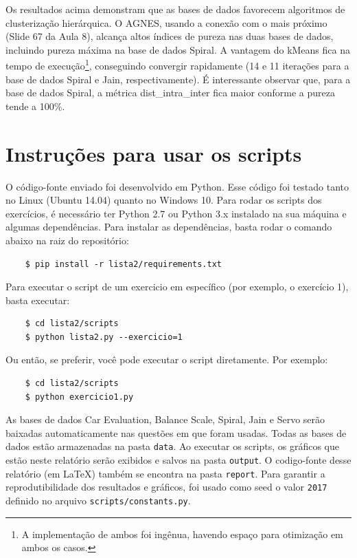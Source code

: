 \documentclass{article}
\begin{document}
Os resultados acima demonstram que as bases de dados favorecem algoritmos de clusterização hierárquica. O AGNES, usando a conexão com o mais próximo (Slide 67 da Aula 8), alcança altos índices de pureza nas duas bases de dados, incluindo pureza máxima na base de dados Spiral. A vantagem do kMeans fica na tempo de execução\footnote{A implementação de ambos foi ingênua, havendo espaço para otimização em ambos os casos.}, conseguindo convergir rapidamente (14 e 11 iterações para a base de dados Spiral e Jain, respectivamente). É interessante observar que, para a base de dados Spiral, a métrica dist\_intra\_inter fica maior conforme a pureza tende a 100\%.


\section*{Instruções para usar os scripts}

O código-fonte enviado foi desenvolvido em Python. Esse código foi testado tanto no Linux (Ubuntu 14.04) quanto no Windows 10. Para rodar os scripts dos exercícios, é necessário ter Python 2.7 ou Python 3.x instalado na sua máquina e algumas dependências. Para instalar as dependências, basta rodar o comando abaixo na raiz do repositório:

\begin{verbatim}
	$ pip install -r lista2/requirements.txt
\end{verbatim}

Para executar o script de um exercicio em específico (por exemplo, o exercício 1), basta executar:

\begin{verbatim}
	$ cd lista2/scripts
	$ python lista2.py --exercicio=1
\end{verbatim}

Ou então, se preferir, você pode executar o script diretamente. Por exemplo:

\begin{verbatim}
	$ cd lista2/scripts
	$ python exercicio1.py
\end{verbatim}

As bases de dados Car Evaluation, Balance Scale, Spiral, Jain e Servo serão baixadas automaticamente nas questões em que foram usadas. Todas as bases de dados estão armazenadas na pasta \texttt{data}. Ao executar os scripts, os gráficos que estão neste relatório serão exibidos e salvos na pasta \texttt{output}. O codigo-fonte desse relatório (em \LaTeX) também se encontra na pasta \texttt{report}. Para garantir a reprodutibilidade dos resultados e gráficos, foi usado como seed o valor \texttt{2017} definido no arquivo \texttt{scripts/constants.py}.
\end{document}
